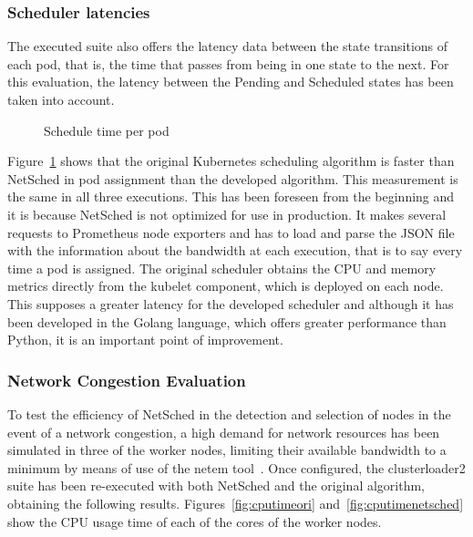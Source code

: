 \documentclass[conference]{IEEEtran}
\begin{document}
\subsubsection{Scheduler latencies}\label{sec:schedlat}
The executed suite also offers the latency data between the state transitions of each pod, that is, the time that passes from being in one state to the next. For this evaluation, the latency between the Pending and Scheduled states has been taken into account.

\begin{figure}[h]
\begin{center}
\strut{}
\caption{Schedule time per pod}\label{fig:schedtime}
\end{center}
\end{figure}

Figure~\ref{fig:schedtime} shows that the original Kubernetes scheduling algorithm is faster than NetSched in pod assignment than the developed algorithm. This measurement is the same in all three executions. This has been foreseen from 
the beginning and it is because NetSched is not optimized for use in production. It makes several requests to Prometheus node exporters and has to load and parse the JSON 
file with the information about the bandwidth at each execution, that is to say every time a pod is assigned. The original scheduler obtains the CPU and memory metrics directly from the kubelet component, 
which is deployed on each node. This supposes a greater latency for the developed scheduler and although it has been developed in the Golang language, which offers greater performance than Python, it is an 
important point of improvement.

\subsubsection{Network Congestion Evaluation}\label{sec:netcongest}

To test the efficiency of NetSched in the detection and selection of nodes in the event of a network congestion, a high demand for network resources has been simulated in three of the worker nodes, 
limiting their available bandwidth to a minimum by means of use of the netem tool~\cite{netem}. Once configured, the clusterloader2 suite has been re-executed with both NetSched and the original algorithm, obtaining the following results. Figures~\ref{fig:cputimeori} and~\ref{fig:cputimenetsched} show the CPU usage time of each of the cores of the worker nodes.
\end{document}
